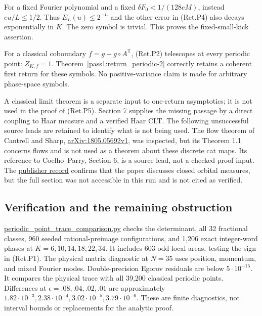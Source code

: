 For a fixed Fourier polynomial and a fixed
\(\delta F_0<1/(128eM)\), instead \(eu/L\le1/2\).
Thus \(E_L(u)\le2^{-L}\) and the other error in (Ret.P4)
also decays exponentially in \(K\). The zero symbol is trivial.
This proves the fixed-small-kick assertion.

For a classical coboundary \(f=g-g\circ A^{\mathsf T}\), (Ret.P2)
telescopes at every periodic point: \(Z_{K,f}=1\).
Theorem~\ref{pass1:return_periodic-2} correctly retains a coherent first return for these symbols.
No positive-variance claim is made for arbitrary phase-space symbols.

A classical limit theorem is a separate input to one-return asymptotics;
it is not used in the proof of (Ret.P5). Section 7 supplies the missing passage
by a direct coupling to Haar measure and a verified Haar CLT.
The following unsuccessful source leads are retained to identify what
is not being used.
The flow theorem of Cantrell and Sharp,
\href{https://arxiv.org/pdf/1805.05692v1.pdf}{arXiv:1805.05692v1},
was inspected, but its Theorem 1.1 concerns flows and is not used
as a theorem about these discrete cat maps.
Its reference to Coelho--Parry, Section 6, is a source lead,
not a checked proof input. The
\href{https://link.springer.com/article/10.1007/BF02937307}{publisher record}
confirms that the paper discusses closed orbital measures, but the full
section was not accessible in this run and is not cited as verified.

\hypertarget{verification-and-the-remaining-obstruction}{%
\subsection{Verification and the remaining obstruction}\label{verification-and-the-remaining-obstruction}}

\href{https://github.com/ChurilovMaksim/BGS/blob/main/computations/verification/periodic_point_trace_comparison.py}{periodic\_point\_trace\_comparison.py}
checks the determinant, all 32 fractional classes, 960 seeded
rational-preimage configurations, and 1,206 exact integer-word phases
at \(K=6,10,14,18,22,34\).
It includes 603 odd local areas, testing the sign in (Ret.P1).
The physical matrix diagnostic at \(N=35\) uses position, momentum,
and mixed Fourier modes. Double-precision Egorov residuals are
below \(5\cdot10^{-15}\).
It compares the physical trace with all 39,200 classical periodic points.
Differences at \(\epsilon=.08,.04,.02,.01\) are approximately
\(1.82\cdot10^{-3},2.38\cdot10^{-4},3.02\cdot10^{-5},3.79\cdot10^{-6}\).
These are finite diagnostics, not interval bounds or replacements
for the analytic proof.


